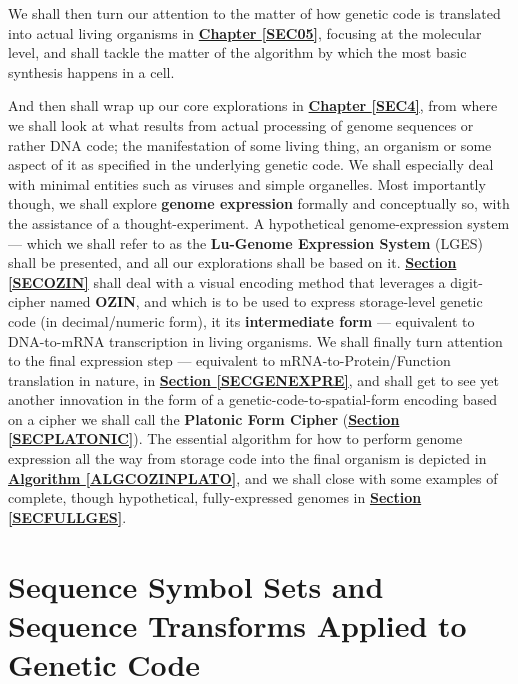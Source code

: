 \documentclass[a4paper, 18pt]{book} %
\begin{document}
We shall then turn our attention to the matter of how genetic code is translated into actual living organisms in \textbf{\hyperref[SEC05]{Chapter \ref{SEC05}}}, focusing at the molecular level, and shall tackle the matter of the algorithm by which the most basic synthesis happens in a cell.


And then shall wrap up our core explorations in \textbf{\hyperref[SEC4]{Chapter \ref{SEC4}}}, from where we shall look at what results from actual processing of genome sequences or rather DNA code; the manifestation of some living thing, an organism or some aspect of it as specified in the underlying genetic code. We shall especially deal with minimal entities such as viruses and simple organelles. Most importantly though, we shall explore \textbf{genome expression} formally and conceptually so, with the assistance of a thought-experiment. A hypothetical genome-expression system --- which we shall refer to as the \textbf{Lu-Genome Expression System} (LGES) shall be presented, and all our explorations shall be based on it. \textbf{\hyperref[SECOZIN]{Section \ref{SECOZIN}}} shall deal with a visual encoding method that leverages a digit-cipher named \textbf{OZIN}, and which is to be used to express storage-level genetic code (in decimal/numeric form), it its \textbf{intermediate form} --- equivalent to DNA-to-mRNA transcription in living organisms. We shall finally turn attention to the final expression step --- equivalent to mRNA-to-Protein/Function translation in nature, in \textbf{\hyperref[SECGENEXPRE]{Section \ref{SECGENEXPRE}}}, and shall get to see yet another innovation in the form of a genetic-code-to-spatial-form encoding based on a cipher we shall call the \textbf{Platonic Form Cipher} (\textbf{\hyperref[SECPLATONIC]{Section \ref{SECPLATONIC}}}). The essential algorithm for how to perform genome expression all the way from storage code into the final organism is depicted in \textbf{\hyperref[ALGCOZINPLATO]{Algorithm \ref{ALGCOZINPLATO}}}, and we shall close with some examples of complete, though hypothetical, fully-expressed genomes in \textbf{\hyperref[SECFULLGES]{Section \ref{SECFULLGES}}}.


\chapter{Sequence Symbol Sets and Sequence Transforms Applied to Genetic Code}
\label{SEC2}
\end{document}
